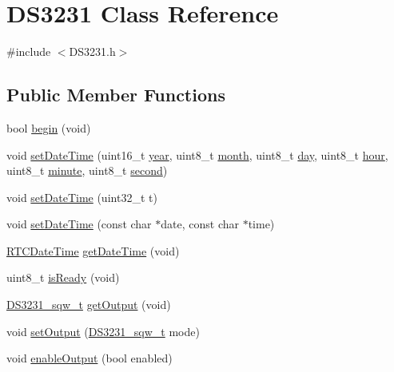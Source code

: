 \hypertarget{class_d_s3231}{}\section{D\+S3231 Class Reference}
\label{class_d_s3231}


{\ttfamily \#include $<$D\+S3231.\+h$>$}

\subsection*{Public Member Functions}
\begin{DoxyCompactItemize}
\item 
bool \hyperlink{class_d_s3231_a1b6b23f76ae2a8c27f78e946608467ae}{begin} (void)
\item 
void \hyperlink{class_d_s3231_a15eb3576feaa3535415e9b82367c344c}{set\+Date\+Time} (uint16\+\_\+t \hyperlink{_time_8cpp_a8608865f8292c0505e02b67fd1cf39e8}{year}, uint8\+\_\+t \hyperlink{_time_8cpp_a726c707dded9d78cf076554eceb956ec}{month}, uint8\+\_\+t \hyperlink{_time_8cpp_a51dcd9f072551ba8f47449a4e7f78c29}{day}, uint8\+\_\+t \hyperlink{_time_8cpp_ac4706d0cffc9e111a6c6a757b462e88e}{hour}, uint8\+\_\+t \hyperlink{_time_8cpp_a88285e3771bcb970424122a6ee4b40fa}{minute}, uint8\+\_\+t \hyperlink{_time_8cpp_a10a4dd811353baa12dadadee7c7e5099}{second})
\item 
void \hyperlink{class_d_s3231_ac8ccbb72f7cfbb27df1558a8896ef236}{set\+Date\+Time} (uint32\+\_\+t t)
\item 
void \hyperlink{class_d_s3231_a95352ab8a40b383e4680e489ec3ee68a}{set\+Date\+Time} (const char $\ast$date, const char $\ast$time)
\item 
\hyperlink{_d_s3231_8h_struct_r_t_c_date_time}{R\+T\+C\+Date\+Time} \hyperlink{class_d_s3231_adc4bc3149377fef827a7e504264fbd40}{get\+Date\+Time} (void)
\item 
uint8\+\_\+t \hyperlink{class_d_s3231_ad5c01a51a34c83a2309694a653b4daf4}{is\+Ready} (void)
\item 
\hyperlink{_d_s3231_8h_afb80663b1dbdb6c798670ca900ea35e1}{D\+S3231\+\_\+sqw\+\_\+t} \hyperlink{class_d_s3231_a43521db28f7a704e5f6364e03e73f820}{get\+Output} (void)
\item 
void \hyperlink{class_d_s3231_a1eafc57831fe8fc1ce4145911980e0f7}{set\+Output} (\hyperlink{_d_s3231_8h_afb80663b1dbdb6c798670ca900ea35e1}{D\+S3231\+\_\+sqw\+\_\+t} mode)
\item 
void \hyperlink{class_d_s3231_a67d438ac8a42dfdf68454444a3df336f}{enable\+Output} (bool enabled)

\end{DoxyCompactItemize}
